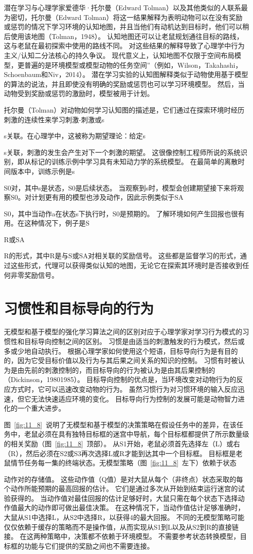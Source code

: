 {{{{{{潜在学习与心理学家爱德华·托尔曼（Edward Tolman）以及其他类似的人联系最为密切，托尔曼（Edward Tolman）将这一结果解释为表明动物可以在没有奖励或惩罚的情况下学习环境的认知地图，并且当他们有动机达到目标时，他们可以稍后使用该地图（Tolman，1948）。
认知地图还可以让老鼠规划通往目标的路线，这与老鼠在最初探索中使用的路线不同。
对这些结果的解释导致了心理学中行为主义/认知二分法核心的持久争议。
现代意义上，认知地图不仅限于空间布局模型，更普遍的是环境模型或模型动物的任务空间”（例如，Wilson，Takahashi，Schoenbaum和Niv，2014）。
潜在学习实验的认知图解释类似于动物使用基于模型的算法的说法，并且即使没有明确的奖励或惩罚也可以学习环境模型。
然后，当动物受到奖励或惩罚的激励时，模型被用于计划。


托尔曼（Tolman）对动物如何学习认知图的描述是，它们通过在探索环境时经历刺激的连续性来学习刺激-刺激或s{s关联。在心理学中，这被称为期望理论：给定s{s关联，刺激的发生会产生对下一个刺激的期望。
这很像控制工程师所说的系统识别，即从标记的训练示例中学习具有未知动力学的系统模型。
在最简单的离散时间版本中，训练示例是s{S0对，其中s是状态，S0是后续状态。
当观察到s时，模型会创建期望接下来将观察S0。对计划更有用的模型也涉及动作，因此示例类似于SA{S0，其中当动作a在状态s下执行时，S0是预期的。
了解环境如何产生回报也很有用。在这种情况下，例子是S{R或SA{R的形式，其中R是与S或SA对相关联的奖励信号。
这些都是监督学习的形式，通过这些形式，代理可以获得类似认知的地图，无论它在探索其环境时是否接收到任何非零奖励信号。


\section{习惯性和目标导向的行为} \label{sec:habitual_behavior}

无模型和基于模型的强化学习算法之间的区别对应于心理学家对学习行为模式的习惯性和目标导向控制之间的区别。
习惯是由适当的刺激触发的行为模式，然后或多或少地自动执行。
根据心理学家如何使用这个短语，目标导向行为是有目的的，因为它受目标价值以及行为与其后果之间关系的知识的控制。
习惯有时被认为是由先前的刺激控制的，而目标导向的行为被认为是由其后果控制的（Dickinson，19801985）。
目标导向控制的优点是，当环境改变对动物行为的反应方式时，它可以迅速改变动物的行为。
虽然习惯行为对习惯环境的输入反应迅速，但它无法快速适应环境的变化。
目标导向行为控制的发展可能是动物智力进化的一个重大进步。


图~\ref{fig:11_8}~说明了无模型和基于模型的决策策略在假设任务中的差异，在该任务中，老鼠必须在具有独特目标框的迷宫中导航，每个目标框都提供了所示数量级的相关奖励（图~\ref{fig:11_8}~顶部）。
从S1开始，老鼠必须首先选择左（L）或右（R），然后必须在S2或S3再次选择L或R才能到达其中一个目标框。
目标框是老鼠情节任务每一集的终端状态。无模型策略（图~\ref{fig:11_8}~左下）依赖于状态{动作对的存储值。
这些动作值（Q值）是对大鼠从每个（非终点）状态采取的每个动作所能预期的最高回报的估计。
它们是通过多次从开始到结束运行迷宫的试验获得的。
当动作值对最佳回报的估计足够好时，大鼠只需在每个状态下选择动作值最大的动作即可做出最佳决策。
在这种情况下，当动作值估计足够准确时，大鼠从S1中选择L，从S2中选择R，以获得4的最大回报。
不同的无模型策略可能仅仅依赖于缓存的策略而不是操作值，从而实现从S1到L以及从S2到R的直接链接。
在这两种策略中，决策都不依赖于环境模型。
不需要参考状态转换模型，目标框的功能与它们提供的奖励之间也不需要连接。


}}}}}}}}}}}}}
